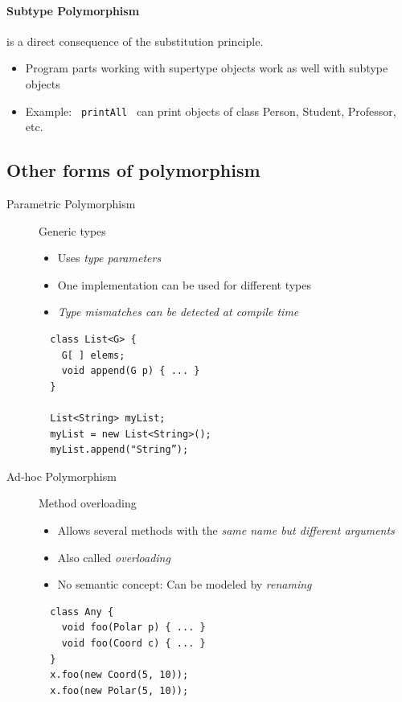 \paragraph{Subtype Polymorphism} is a direct consequence of the substitution principle.
\begin{itemize}
 \item Program parts working with supertype objects work as well with subtype objects
 \item Example: \lstinline{ printAll } can print objects of class Person, Student, Professor, etc.
\end{itemize}
\subsection{Other forms of polymorphism}
\begin{description}
 \item[Parametric Polymorphism] Generic types
  \begin{itemize}
   \item Uses \emph{type parameters}
   \item One implementation can be used for different types
   \item \emph{Type mismatches can be detected at compile time}
  \end{itemize}
  \lstset{language=Java}
  \begin{lstlisting}
  class List<G> {
    G[ ] elems;
    void append(G p) { ... }
  }
  
  List<String> myList;
  myList = new List<String>();
  myList.append("String”);
  \end{lstlisting}
 \item[Ad-hoc Polymorphism] Method overloading
  \begin{itemize}
   \item Allows several methods with the \emph{same name but different arguments}
   \item Also called \emph{overloading}
   \item No semantic concept: Can be modeled by \emph{renaming}
  \end{itemize}
  \begin{lstlisting}
  class Any {
    void foo(Polar p) { ... }
    void foo(Coord c) { ... }
  }
  x.foo(new Coord(5, 10));
  x.foo(new Polar(5, 10));
  \end{lstlisting}
\end{description}

